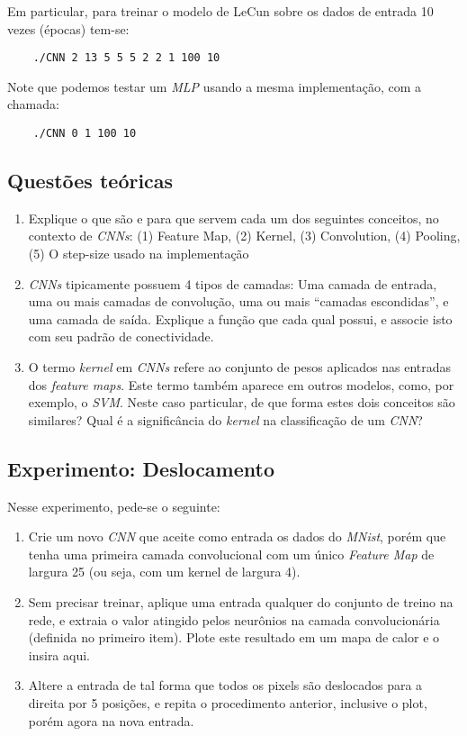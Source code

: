 \documentclass[12pt, a4paper]{article}
\begin{document}
Em particular, para treinar o modelo de LeCun sobre os dados de entrada 10 vezes (épocas) tem-se:
\begin{verbatim}
	./CNN 2 13 5 5 5 2 2 1 100 10
\end{verbatim}

Note que podemos testar um \emph{MLP} usando a mesma implementação, com a chamada:
\begin{verbatim}
	./CNN 0 1 100 10
\end{verbatim}

\subsection{Questões teóricas}

\begin{enumerate}
\item Explique o que são e para que servem cada um dos seguintes conceitos, no contexto de \emph{CNNs}: (1) Feature Map, (2) Kernel, (3) Convolution, (4) Pooling, (5) O step-size usado na implementação
\item \emph{CNNs} tipicamente possuem 4 tipos de camadas: Uma camada de entrada, uma ou mais camadas de convolução, uma ou mais ``camadas escondidas'', e uma camada de saída. Explique a função que cada qual possui, e associe isto com seu padrão de conectividade.  
\item O termo \emph{kernel} em \emph{CNNs} refere ao conjunto de pesos aplicados nas entradas dos \emph{feature maps}. Este termo também aparece em outros modelos, como, por exemplo, o \emph{SVM}. Neste caso particular, de que forma estes dois conceitos são similares? Qual é a significância do \emph{kernel} na classificação de um \emph{CNN}?
\end{enumerate}


\subsection{Experimento: Deslocamento }

Nesse experimento, pede-se o seguinte:
\begin{enumerate}
\item Crie um novo \emph{CNN} que aceite como entrada os dados do \emph{MNist}, porém que tenha uma primeira camada convolucional com um único \emph{Feature Map} de largura 25 (ou seja, com um kernel de largura 4).
\item Sem precisar treinar, aplique uma entrada qualquer do conjunto de treino na rede, e extraia o valor atingido pelos neurônios na camada convolucionária (definida no primeiro item). Plote este resultado em um mapa de calor e o insira aqui. 
\item Altere a entrada de tal forma que todos os pixels são deslocados para a direita por 5 posições, e repita o procedimento anterior, inclusive o plot, porém agora na nova entrada. 
\end{enumerate}
\end{document}

